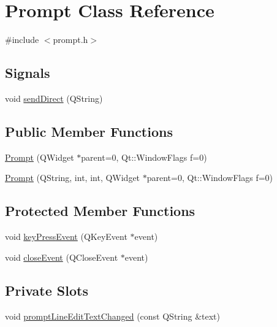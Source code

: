 \hypertarget{classPrompt}{
\section{Prompt Class Reference}
\label{classPrompt}
}


{\ttfamily \#include $<$prompt.h$>$}

\subsection*{Signals}
\begin{DoxyCompactItemize}
\item 
void \hyperlink{classPrompt_a115dfab6b20a8d28f953089f9eef1120}{sendDirect} (QString)
\end{DoxyCompactItemize}
\subsection*{Public Member Functions}
\begin{DoxyCompactItemize}
\item 
\hyperlink{classPrompt_a9b9a2e32ba8ef0639dfe5f4eb263ab61}{Prompt} (QWidget $\ast$parent=0, Qt::WindowFlags f=0)
\item 
\hyperlink{classPrompt_aca349f134a91a4a1e5126f313fad0ca9}{Prompt} (QString, int, int, QWidget $\ast$parent=0, Qt::WindowFlags f=0)
\end{DoxyCompactItemize}
\subsection*{Protected Member Functions}
\begin{DoxyCompactItemize}
\item 
void \hyperlink{classPrompt_a3e8ab9fc256bf464c751fe36d533bc0a}{keyPressEvent} (QKeyEvent $\ast$event)
\item 
void \hyperlink{classPrompt_a5c2538d52f63f936dd7d987e2f892f58}{closeEvent} (QCloseEvent $\ast$event)
\end{DoxyCompactItemize}
\subsection*{Private Slots}
\begin{DoxyCompactItemize}
\item 
void \hyperlink{classPrompt_aef3df767b03b5ff95017c85f96d2ecda}{promptLineEditTextChanged} (const QString \&text)
\end{DoxyCompactItemize}
